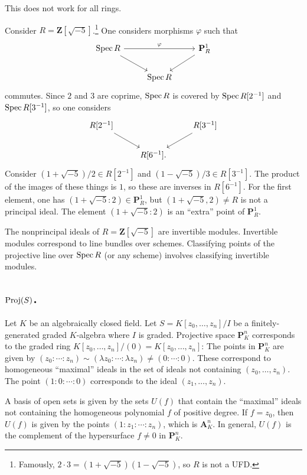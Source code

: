 \documentclass [11 pt, oneside] {article}
\begin{document}
This does not work for all rings.

\begin{example}[ ]\label{}\text{}
Consider $R=\mathbf{Z}[\sqrt{-5} ]$.\footnote{Famously, $2\cdot 3 = (1+\sqrt{-5} ) (1-\sqrt{-5} )$, so $R$ is not a UFD.} One considers morphisms $\varphi$ such that
\[
\begin{tikzcd}
	\Spec R \ar[rr,"\varphi"] \ar[dr] &&\mathbf{P}^1_{R}\ar[dl]\\
				       &\Spec R
\end{tikzcd}
\]
commutes. Since $2$ and $3$ are coprime, $\operatorname{Spec} R$ is covered by $\operatorname{Spec} R[2^{-1}]$ and $\operatorname{Spec} R[3^{-1}]$, so one considers
\[
\begin{tikzcd}
	R[2^{-1}] \ar[rd] && R[3^{-1}] \ar[dl]\\
			  &R[6^{-1}].
\end{tikzcd}
\]
Consider $(1+\sqrt{-5} ) /2\in R[2^{-1}]$ and $(1-\sqrt{-5} ) /3\in R[3^{-1}]$. The product of the images of these things is $1$, so these are inverses in $R[6^{-1}]$. For the first element, one has $(1+\sqrt{-5}:2 ) \in \mathbf{P}^1_{R}$, but $(1+\sqrt{-5}, 2 ) \ne R$ is not a principal ideal. The element $(1+\sqrt{-5}:2 )$ is an ``extra'' point of $\mathbf{P}^1_{R}$. 
\end{example}

\begin{remark}
	The nonprincipal ideals of $R=\mathbf{Z}[\sqrt{-5}] $ are invertible modules. Invertible modules correspond to line bundles over schemes. Classifying points of the projective line over $\operatorname{Spec} R$ (or any scheme) involves classifying invertible modules.
\end{remark}

\subsection{\texorpdfstring{$\operatorname{Proj}(S)$}{Proj (S)}.}
\label{Projc}
Let $K$ be an algebraically closed field. Let $S=K[z_0,\hdots, z_n]/I$ be a finitely-generated graded $K$-algebra where $I$ is graded. Projective space $\mathbf{P}^n_K$ corresponds to the graded ring $K[z_0,\hdots, z_n] /(0)= K[z_0,\hdots,z_n]$: The points in $\mathbf{P}^n_K$ are given by $(z_0:\cdots:z_n)\sim (\lambda z_0:\cdots:\lambda z_n)\ne (0:\cdots:0)$. These correspond to homogeneous ``maximal'' ideals in the set of ideals not containing $(z_0,\hdots,z_n)$. The point $(1:0:\cdots:0)$ corresponds to the ideal $(z_1,\hdots,z_n)$.

A basis of open sets is given by the sets $U(f)$ that contain the ``maximal'' ideals not containing the homogeneous polynomial $f$ of positive degree. If $f=z_0$, then $U(f)$ is given by the points $(1:z_1:\cdots:z_n)$, which is $\mathbf{A}^n_K$. In general, $U(f)$ is the complement of the hypersurface $f\ne 0$ in $\mathbf{P}^n_K$.
\end{document}
